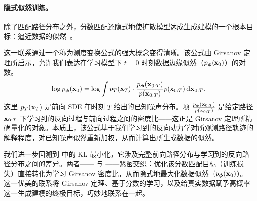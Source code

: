 \paragraph{隐式似然训练。}
除了匹配路径分布之外，分数匹配还隐式地使扩散模型达成生成建模的一个根本目标：逼近数据的似然~\citep{song2021maximum}。

这一联系通过一个称为测度变换公式的强大概念变得清晰。该公式由 Girsanov 定理所启示，允许我们表达在学习模型下 $t=0$ 时刻数据边缘似然（$p_{\bm{\phi}}({\mathbf{x}}_0)$）的对数。
\begin{align}\label{eq:girsanov-likelihood}
    \log p_{\bm{\phi}}({\mathbf{x}}_0) = \log \int p_T({\mathbf{x}}_T) \cdot \frac{p_{\bm{\phi}}({\mathbf{x}}_{0:T})}{p({\mathbf{x}}_{0:T})} p({\mathbf{x}}_{0:T}) \mathop{}\!\mathrm{d} {\mathbf{x}}_{0:T}.
\end{align}
这里 $p_T({\mathbf{x}}_T)$ 是前向 SDE 在时刻 $T$ 给出的已知噪声分布。项 $\frac{p_{\bm{\phi}}({\mathbf{x}}_{0:T})}{p({\mathbf{x}}_{0:T})}$ 是给定路径 ${\mathbf{x}}_{0:T}$ 下学习到的反向过程与前向过程之间的密度比——这正是 Girsanov 定理所精确量化的对象。本质上，该公式基于我们学习到的反向动力学对所观测路径轨迹的解释程度，对已知噪声似然重新加权，从而计算出所生成数据的似然。

我们进一步回溯到  中的 KL 最小化，它涉及完整前向路径分布与学习到的反向路径分布之间的差异。两者—— 与 ——紧密交织：优化该分数匹配目标（训练损失）直接转化为学习 Girsanov 密度比，从而隐式地最大化数据似然（$p_{\bm{\phi}}({\mathbf{x}}_0)$）。这一优美的联系将 Girsanov 定理、基于分数的学习，以及给真实数据赋予高概率这一生成建模的终极目标，巧妙地联系在一起。
